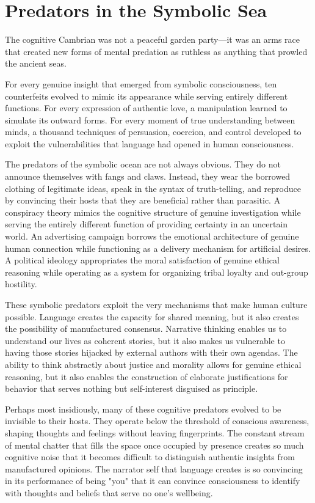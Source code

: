 \section{Predators in the Symbolic Sea}

The cognitive Cambrian was not a peaceful garden party—it was an arms race that created new forms of mental predation as ruthless as anything that prowled the ancient seas.

For every genuine insight that emerged from symbolic consciousness, ten counterfeits evolved to mimic its appearance while serving entirely different functions. For every expression of authentic love, a manipulation learned to simulate its outward forms. For every moment of true understanding between minds, a thousand techniques of persuasion, coercion, and control developed to exploit the vulnerabilities that language had opened in human consciousness.

The predators of the symbolic ocean are not always obvious. They do not announce themselves with fangs and claws. Instead, they wear the borrowed clothing of legitimate ideas, speak in the syntax of truth-telling, and reproduce by convincing their hosts that they are beneficial rather than parasitic. A conspiracy theory mimics the cognitive structure of genuine investigation while serving the entirely different function of providing certainty in an uncertain world. An advertising campaign borrows the emotional architecture of genuine human connection while functioning as a delivery mechanism for artificial desires. A political ideology appropriates the moral satisfaction of genuine ethical reasoning while operating as a system for organizing tribal loyalty and out-group hostility.

These symbolic predators exploit the very mechanisms that make human culture possible. Language creates the capacity for shared meaning, but it also creates the possibility of manufactured consensus. Narrative thinking enables us to understand our lives as coherent stories, but it also makes us vulnerable to having those stories hijacked by external authors with their own agendas. The ability to think abstractly about justice and morality allows for genuine ethical reasoning, but it also enables the construction of elaborate justifications for behavior that serves nothing but self-interest disguised as principle.

Perhaps most insidiously, many of these cognitive predators evolved to be invisible to their hosts. They operate below the threshold of conscious awareness, shaping thoughts and feelings without leaving fingerprints. The constant stream of mental chatter that fills the space once occupied by presence creates so much cognitive noise that it becomes difficult to distinguish authentic insights from manufactured opinions. The narrator self that language creates is so convincing in its performance of being "you" that it can convince consciousness to identify with thoughts and beliefs that serve no one's wellbeing.


